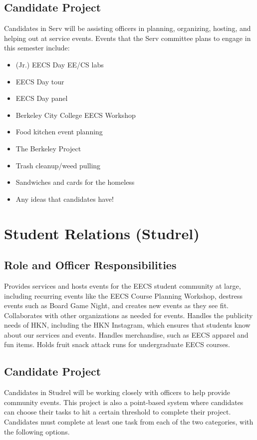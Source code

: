 \documentclass[11pt, article, oneside]{memoir}
\begin{document}
    \subsection{Candidate Project}
        Candidates in Serv will be assisting officers in planning, organizing, hosting, and helping out at service events.
        Events that the Serv committee plans to engage in this semester include:
        \begin{itemize}
            \item (Jr.) EECS Day EE/CS labs
            \item EECS Day tour
            \item EECS Day panel 
            \item Berkeley City College EECS Workshop 
            \item Food kitchen event planning 
            \item The Berkeley Project 
            \item Trash cleanup/weed pulling
            \item Sandwiches and cards for the homeless
            \item Any ideas that candidates have!
        \end{itemize}

    \section{Student Relations (Studrel)}
    \subsection{Role and Officer Responsibilities}
        Provides services and hosts events for the EECS student community at large, including recurring events like the EECS Course Planning Workshop, destress events such as Board Game Night, and creates new events as they see fit.
        Collaborates with other organizations as needed for events.
        Handles the publicity needs of HKN, including the HKN Instagram, which ensures that students know about our services and events.
        Handles merchandise, such as EECS apparel and fun items.
        Holds fruit snack attack runs for undergraduate EECS courses.

    \subsection{Candidate Project}
        Candidates in Studrel will be working closely with officers to help provide community events.
        This project is also a point-based system where candidates can choose their tasks to hit a certain threshold to complete their project.
        Candidates must complete at least one task from each of the two categories, with the following options.
\end{document}
